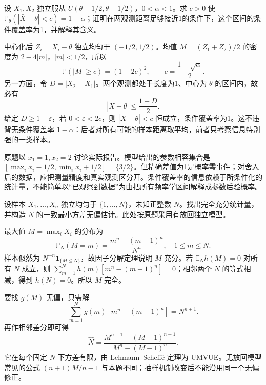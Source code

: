 \documentclass[UTF8,12pt,a4paper,fontset=fandol]{ctexbook}
\newcommand{\E}{\mathbb E}
\newcommand{\PP}{\mathbb P}
\begin{document}
\begin{example}[原题5：均匀位置族的条件覆盖率]\label{yau:2013-5}
设 $X_1,X_2$ 独立服从 $U(\theta-1/2,\theta+1/2)$，$0<\alpha<1$。求 $c>0$ 使 $\PP_\theta(|\bar X-\theta|<c)=1-\alpha$；证明在两观测距离足够接近1的条件下，这个区间的条件覆盖率为1，并解释其含义。
\end{example}
\begin{solve}
中心化后 $Z_i=X_i-\theta$ 独立均匀于 $(-1/2,1/2)$。均值 $M=(Z_1+Z_2)/2$ 的密度为 $2-4|m|$，$|m|<1/2$，所以
\[
\PP(|M|\ge c)=(1-2c)^2,\qquad c=\frac{1-\sqrt\alpha}{2}.
\]
另一方面，令 $D=|X_2-X_1|$。两个观测都处于长度为1、中心为 $\theta$ 的区间内，故必有
\[
|\bar X-\theta|\le\frac{1-D}{2}.
\]
给定 $D\ge1-\varepsilon$，若 $0<\varepsilon<2c$，则 $|\bar X-\theta|<c$ 恒成立，条件覆盖率为1。这不违背无条件覆盖率 $1-\alpha$：后者对所有可能的样本距离取平均，前者只考察信息特别强的一类样本。

原题以 $x_1=1,x_2=2$ 讨论实际报告。模型给出的参数相容集合是 $[\max_i x_i-1/2,\min_i x_i+1/2]=\{3/2\}$。但精确差值为1是概率零事件；对舍入后的数据，应把测量精度和真实观测区分开。条件覆盖率的信息依赖于所条件化的统计量，不能简单以“已观察到数据”为由把所有频率学区间解释成参数后验概率。
\end{solve}

\begin{example}\label{yau:2013-6}
设样本 $X_1,\ldots,X_n$ 独立均匀于 $\{1,\ldots,N\}$，未知正整数 $N$。找出完全充分统计量，并构造 $N$ 的一致最小方差无偏估计。此处按原题采用有放回独立模型。
\end{example}
\begin{solve}
最大值 $M=\max_iX_i$ 的分布为
\[
\PP_N(M=m)=\frac{m^n-(m-1)^n}{N^n},\quad1\le m\le N.
\]
样本似然为 $N^{-n}\mathbf1_{\{M\le N\}}$，故因子分解定理说明 $M$ 充分。若 $\E_N h(M)=0$ 对所有 $N$ 成立，则 $\sum_{m=1}^Nh(m)[m^n-(m-1)^n]=0$；相邻两个 $N$ 的等式相减，得到 $h(N)=0$。所以 $M$ 完全。

要找 $g(M)$ 无偏，只需解
\[
\sum_{m=1}^Ng(m)[m^n-(m-1)^n]=N^{n+1}.
\]
再作相邻差分即可得
\[
\widehat N=\frac{M^{n+1}-(M-1)^{n+1}}{M^n-(M-1)^n}.
\]
它在每个固定 $N$ 下方差有限，由 Lehmann--Scheffé 定理为 UMVUE。无放回模型常见的公式 $(n+1)M/n-1$ 与本题不同；抽样机制改变后不能沿用同一个无偏修正。
\end{solve}
\end{document}
